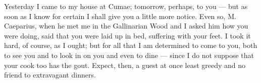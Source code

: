 

 Yesterday I came to my house at Cumae; tomorrow, perhaps, to you --- but as soon as I know for certain I shall give you a little more notice. Even so, M. Caeparius, when he met me in the Gallinarian Wood and I asked him how you were doing, said that you were laid up in bed, suffering with your feet. I took it hard, of course, as I ought; but for all that I am determined to come to you, both to see you and to look in on you and even to dine --- since I do not suppose that your cook too has the gout. Expect, then, a guest at once least greedy and no friend to extravagant dinners.
